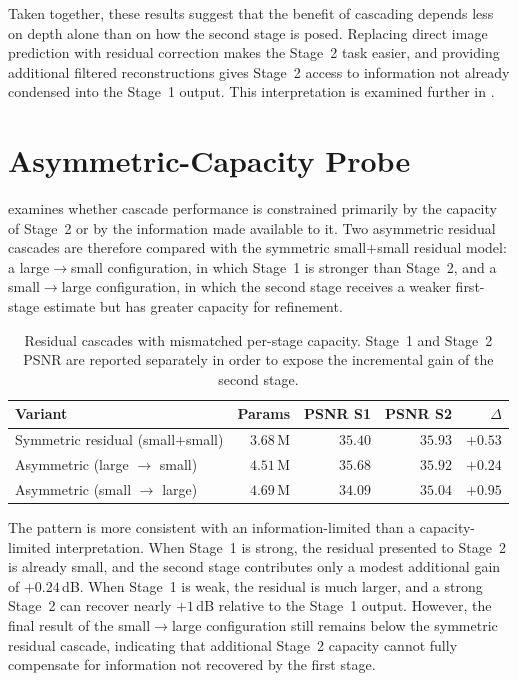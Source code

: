 Taken together, these results suggest that the benefit of cascading depends less on depth alone than on how the second stage is posed. Replacing direct image prediction with residual correction makes the Stage~2 task easier, and providing additional filtered reconstructions gives Stage~2 access to information not already condensed into the Stage~1 output. This interpretation is examined further in .
\section{Asymmetric-Capacity Probe}
\label{sec:exp_asymmetric}

 examines whether cascade performance is constrained primarily by the capacity of Stage~2 or by the information made available to it. Two asymmetric residual cascades are therefore compared with the symmetric small$+$small residual model: a large$\rightarrow$small configuration, in which Stage~1 is stronger than Stage~2, and a small$\rightarrow$large configuration, in which the second stage receives a weaker first-stage estimate but has greater capacity for refinement.

\begin{table}[!htb]
    \centering
    \caption[Asymmetric-capacity residual cascades.]{%
        Residual cascades with mismatched per-stage capacity. Stage~1 and
        Stage~2 PSNR are reported separately in order to expose the
        incremental gain of the second stage.}
    \label{tab:exp_asym}
    \setlength{\tabcolsep}{6pt}
    \small
    \begin{tabular}{@{}l r r r r@{}}
        \toprule
        Variant                                 & Params     & PSNR S1 & PSNR S2 & $\Delta$ \\
        \midrule
        Symmetric residual (small$+$small)      & $3.68$\,M  & $35.40$ & $35.93$ & $+0.53$ \\
        Asymmetric (large $\rightarrow$ small)  & $4.51$\,M  & $35.68$ & $35.92$ & $+0.24$ \\
        Asymmetric (small $\rightarrow$ large)  & $4.69$\,M  & $34.09$ & $35.04$ & $+0.95$ \\
        \bottomrule
    \end{tabular}
\end{table}

The pattern is more consistent with an information-limited than a capacity-limited interpretation. When Stage~1 is strong, the residual presented to Stage~2 is already small, and the second stage contributes only a modest additional gain of $+0.24$\,dB. When Stage~1 is weak, the residual is much larger, and a strong Stage~2 can recover nearly $+1$\,dB relative to the Stage~1 output. However, the final result of the small$\rightarrow$large configuration still remains below the symmetric residual cascade, indicating that additional Stage~2 capacity cannot fully compensate for information not recovered by the first stage.

